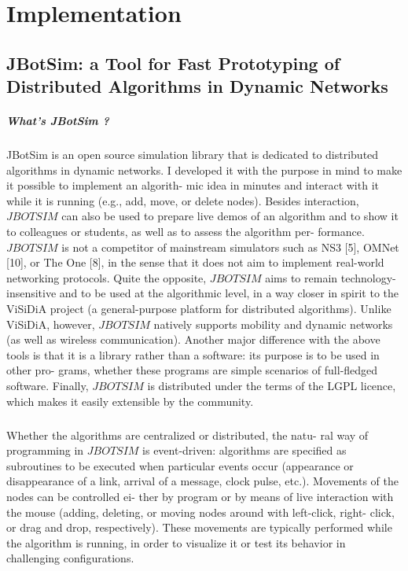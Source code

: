 \chapter{Implementation}
\section{JBotSim: a Tool for Fast Prototyping of Distributed Algorithms in Dynamic Networks}
\paragraph{What's JBotSim ?}JBotSim is an open source simulation library that is dedicated to distributed algorithms in dynamic networks. I developed it with the purpose in mind to make it possible to implement an algorith- mic idea in minutes and interact with it while it is running (e.g., add, move, or delete nodes). Besides interaction, $JBOTSIM$ can also be used to prepare live demos of an algorithm and to show it to colleagues or students, as well as to assess the algorithm per- formance. $JBOTSIM$ is not a competitor of mainstream simulators such as NS3 [5], OMNet [10], or The One [8], in the sense that it does not aim to implement real-world networking protocols. Quite the opposite, $JBOTSIM$ aims to remain technology-insensitive and to be used at the algorithmic level, in a way closer in spirit to the ViSiDiA project (a general-purpose platform for distributed algorithms). Unlike ViSiDiA, however, $JBOTSIM$ natively supports mobility and dynamic networks (as well as wireless communication). Another major difference with the above tools is that it is a library rather than a software: its purpose is to be used in other pro- grams, whether these programs are simple scenarios of full-fledged software. Finally, $JBOTSIM$ is distributed under the terms of the LGPL licence, which makes it easily extensible by the community.
\paragraph{}Whether the algorithms are centralized or distributed, the natu- ral way of programming in $JBOTSIM$ is event-driven: algorithms are specified as subroutines to be executed when particular events occur (appearance or disappearance of a link, arrival of a message, clock pulse, etc.). Movements of the nodes can be controlled ei- ther by program or by means of live interaction with the mouse (adding, deleting, or moving nodes around with left-click, right- click, or drag and drop, respectively). These movements are typically performed while the algorithm is running, in order to visualize it or test its behavior in challenging configurations.
